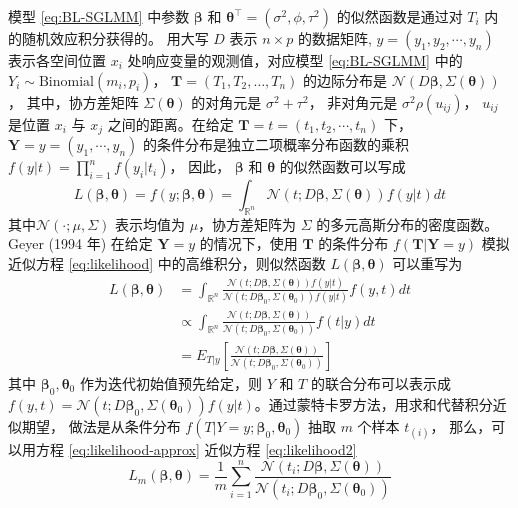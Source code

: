 \documentclass[12pt,a4paper,UTF8,twoside]{book}
\theoremstyle{definition}
\theoremstyle{definition}
\theoremstyle{definition}
\theoremstyle{remark}
\begin{document}
模型 \eqref{eq:BL-SGLMM} 中参数 \(\boldsymbol{\beta}\) 和
\(\boldsymbol{\theta}^{\top} = (\sigma^2,\phi,\tau^2)\)
的似然函数是通过对 \(T_i\) 内的随机效应积分获得的。 用大写 \(D\) 表示
\(n\times p\) 的数据矩阵, \(y = (y_1, y_2,\cdots, y_n)\) 表示各空间位置
\(x_i\) 处响应变量的观测值，对应模型 \eqref{eq:BL-SGLMM} 中的
\(Y_i \sim \mathrm{Binomial}(m_i,p_i)\)，
\(\mathbf{T} = (T_1,T_2,\ldots,T_n)\) 的边际分布是
\(\mathcal{N}(D\boldsymbol{\beta}, \Sigma(\boldsymbol{\theta}))\)，
其中，协方差矩阵 \(\Sigma(\boldsymbol{\theta})\) 的对角元是
\(\sigma^2+\tau^2\)， 非对角元是 \(\sigma^2\rho(u_{ij})\)， \(u_{ij}\)
是位置 \(x_i\) 与 \(x_j\) 之间的距离。在给定
\(\mathbf{T} = t = (t_1,t_2,\cdots,t_n)\) 下，
\(\mathbf{Y} = y =(y_1,\cdots,y_n)\)
的条件分布是独立二项概率分布函数的乘积
\(f(y|t)=\prod_{i=1}^{n}f(y_{i}|t_{i})\)， 因此， \(\boldsymbol{\beta}\)
和 \(\boldsymbol{\theta}\) 的似然函数可以写成 \begin{equation}
L(\boldsymbol{\beta},\boldsymbol{\theta}) = f(y;\boldsymbol{\beta},\boldsymbol{\theta}) = \int_{\mathbb{R}^{n}}\mathcal{N}(t;D\boldsymbol{\beta},\Sigma(\boldsymbol{\theta}))f(y|t)dt \label{eq:likelihood}
\end{equation} \noindent 其中\(\mathcal{N}(\cdot;\mu,\Sigma)\)
表示均值为 \(\mu\)，协方差矩阵为 \(\Sigma\)
的多元高斯分布的密度函数。Geyer (1994 年)\citep{Geyer1994On} 在给定
\(\mathbf{Y}=y\) 的情况下，使用 \(\mathbf{T}\) 的条件分布
\(f(\mathbf{T}|\mathbf{Y}=y)\) 模拟近似方程 \eqref{eq:likelihood}
中的高维积分，则似然函数 \(L(\boldsymbol{\beta},\boldsymbol{\theta})\)
可以重写为 \begin{equation}
\begin{aligned}
L(\boldsymbol{\beta},\boldsymbol{\theta})
& = \int_{\mathbb{R}^{n}} \frac{\mathcal{N}(t;D\boldsymbol{\beta},\Sigma(\boldsymbol{\theta}))f(y|t)}{\mathcal{N}(t;D\boldsymbol{\beta}_{0},\Sigma(\boldsymbol{\theta}_{0}))f(y|t)}f(y,t)dt \\
& \varpropto \int_{\mathbb{R}^{n}} \frac{\mathcal{N}(t;D\boldsymbol{\beta}, \Sigma(\boldsymbol{\theta}))}{\mathcal{N}(t;D\boldsymbol{\beta}_{0}, \Sigma(\boldsymbol{\theta}_{0}))}f(t|y)dt \\
&= E_{T|y}\left[\frac{\mathcal{N}(t; D\boldsymbol{\beta}, \Sigma(\boldsymbol{\theta}))}{\mathcal{N}(t; D\boldsymbol{\beta}_{0}, \Sigma(\boldsymbol{\theta}_{0}))}\right] 
\end{aligned} \label{eq:likelihood2}
\end{equation} \noindent 其中
\(\boldsymbol{\beta}_{0},\boldsymbol{\theta}_{0}\)
作为迭代初始值预先给定，则 \(Y\) 和 \(T\) 的联合分布可以表示成
\(f(y,t) = \mathcal{N}(t; D\boldsymbol{\beta}_{0}, \Sigma(\boldsymbol{\theta}_{0})) f(y|t)\)。通过蒙特卡罗方法，用求和代替积分近似期望，
做法是从条件分布
\(f(T|Y=y; \boldsymbol{\beta}_0, \boldsymbol{\theta}_0)\) 抽取 \(m\)
个样本 \(t_{(i)}\)， 那么，可以用方程 \eqref{eq:likelihood-approx}
近似方程 \eqref{eq:likelihood2} \begin{equation}
L_{m}(\boldsymbol{\beta},\boldsymbol{\theta})=\frac{1}{m}\sum_{i=1}^{n}\frac{\mathcal{N}(t_{i};D\boldsymbol{\beta},\Sigma(\boldsymbol{\theta}))}{\mathcal{N}(t_{i};D\boldsymbol{\beta}_{0},\Sigma(\boldsymbol{\theta}_{0}))} \label{eq:likelihood-approx}
\end{equation}
\end{document}
